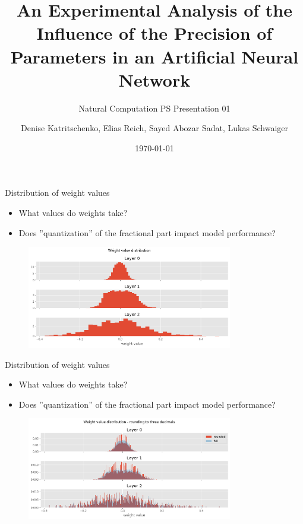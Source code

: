 \documentclass[aspectratio=169]{beamer} %
\title{An Experimental Analysis of the Influence of the Precision of Parameters in an Artificial Neural Network}
\subtitle{Natural Computation PS Presentation 01}
\author[D. K., E. R., S. A. S., L. S.]{Denise Katritschenko, Elias Reich, Sayed Abozar Sadat, Lukas Schwaiger}
\institute[\plusshort]{\pluslong\\ Department of Artificial Intelligence and Human Interfaces (AIHI)}
\date[\today]{\today}
\begin{document}
\frame{\titlepage}
\begin{frame}{Distribution of weight values}
  \begin{itemize}
    \item What values do weights take?
    \item Does ''quantization'' of the fractional part impact model performance?
  \end{itemize}

  \begin{figure}
    \centering  
    \includegraphics[width=0.8\textwidth]{figures/118_dist.png}
  \end{figure}
\end{frame}

\begin{frame}{Distribution of weight values}
  \begin{itemize}
    \item What values do weights take?
    \item Does ''quantization'' of the fractional part impact model performance?
  \end{itemize}

  \begin{figure}
    \centering  
    \includegraphics[width=0.8\textwidth]{figures/118_dist3.png}
  \end{figure}
\end{frame}
\end{document}
